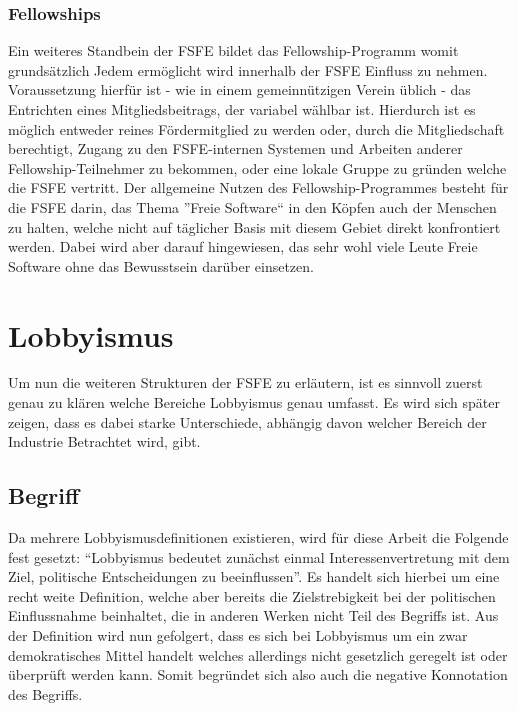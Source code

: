 \subsubsection{Fellowships}
Ein weiteres Standbein der FSFE bildet das Fellowship-Programm womit
grundsätzlich Jedem ermöglicht wird innerhalb der FSFE Einfluss zu nehmen.
Voraussetzung hierfür ist - wie in einem gemeinnützigen Verein üblich - das 
Entrichten eines Mitgliedsbeitrags, der variabel
wählbar ist. Hierdurch ist es möglich entweder reines Fördermitglied zu werden
oder, durch die Mitgliedschaft berechtigt, Zugang zu den FSFE-internen Systemen 
und Arbeiten anderer Fellowship-Teilnehmer zu bekommen, oder eine lokale Gruppe
zu gründen welche die FSFE vertritt. Der allgemeine Nutzen des 
Fellowship-Programmes besteht für die FSFE darin, das Thema ''Freie Software`` 
in 
den Köpfen auch der Menschen zu halten, welche nicht auf täglicher Basis mit 
diesem Gebiet direkt konfrontiert werden. Dabei wird aber darauf hingewiesen, 
das sehr wohl viele Leute Freie Software ohne das Bewusstsein darüber einsetzen.
\cite{PLGreveInterView}


\newpage
\section{Lobbyismus}
Um nun die weiteren Strukturen der FSFE zu erläutern, ist es sinnvoll zuerst 
genau zu klären welche Bereiche Lobbyismus genau umfasst. Es wird sich später 
zeigen, dass es dabei starke Unterschiede, abhängig davon welcher Bereich der 
Industrie Betrachtet wird, gibt.

\subsection{Begriff}
Da mehrere Lobbyismusdefinitionen existieren, wird für diese Arbeit die Folgende
fest gesetzt: ``Lobbyismus bedeutet zunächst einmal Interessenvertretung mit 
dem Ziel, politische Entscheidungen zu beeinflussen''.\cite{LeifSpeth200312} Es 
handelt sich hierbei um eine recht weite Definition, welche aber bereits die 
Zielstrebigkeit bei der politischen Einflussnahme beinhaltet, die in anderen 
Werken nicht Teil des Begriffs ist. Aus der Definition wird nun gefolgert, dass
es sich bei Lobbyismus um ein zwar demokratisches Mittel handelt welches 
allerdings nicht gesetzlich geregelt ist oder überprüft werden kann. Somit 
begründet sich also auch die negative Konnotation des Begriffs.

